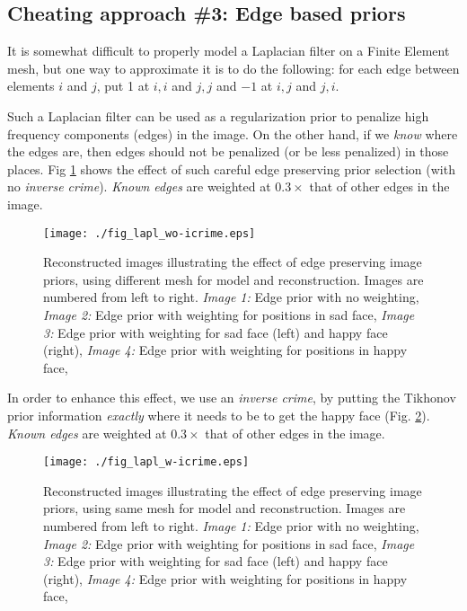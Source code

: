 \documentclass[12pt]{iopart}
\begin{document}
\subsection{ Cheating approach \#3:
             Edge based priors}

It is somewhat difficult to properly model a Laplacian filter
on a Finite Element mesh, but one way to approximate it is to
do the following: for each edge between elements $i$
and $j$, put 1 at $i,i$ and $j,j$
and $-1$ at $i,j$ and $j,i$.

Such a Laplacian filter can be used as a regularization prior
to penalize high frequency components (edges) in the image.
On the other hand, if we {\em know} where the edges are,
then edges should not be penalized (or be less penalized) in
those places. Fig \ref{fig:laplprior}
shows the effect of such careful
edge preserving prior selection (with no {\em inverse crime}).
{\em Known edges} are weighted at $0.3\times$ that of other
edges in the image.

%
%
\begin{figure}[th]
\begin{flushright}
\texttt{[image: ./fig\_lapl\_wo-icrime.eps]}
\caption{\small 
Reconstructed images illustrating the effect of edge
preserving image priors,
using different mesh for model and reconstruction.
Images are numbered from left to right.
{\em Image 1:} Edge prior with no weighting,
{\em Image 2:} Edge prior with weighting for positions in sad face,
{\em Image 3:} Edge prior with weighting for sad face (left) and
happy face (right),
{\em Image 4:} Edge prior with weighting for positions in happy face,
 }
 \label{fig:laplprior}
\end{flushright}
\end{figure}

In order to enhance this effect, we use an {\em inverse crime},
by putting the Tikhonov prior information {\em exactly} where
it needs to be to get the happy face
(Fig. \ref{fig:laplprior-icrime}).
{\em Known edges} are weighted at $0.3\times$ that of other
edges in the image.

%
%
\begin{figure}[th]
\begin{flushright}
\texttt{[image: ./fig\_lapl\_w-icrime.eps]}
\caption{\small 
Reconstructed images illustrating the effect of edge
preserving image priors,
using same mesh for model and reconstruction.
Images are numbered from left to right.
{\em Image 1:} Edge prior with no weighting,
{\em Image 2:} Edge prior with weighting for positions in sad face,
{\em Image 3:} Edge prior with weighting for sad face (left) and
happy face (right),
{\em Image 4:} Edge prior with weighting for positions in happy face,
 }
 \label{fig:laplprior-icrime}
\end{flushright}
\end{figure}
\end{document}
